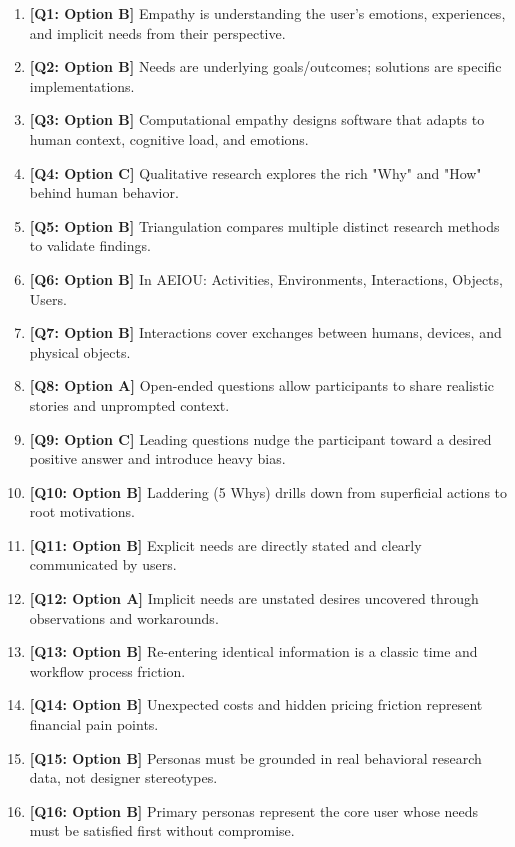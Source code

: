 \begin{expbox}
\begin{enumerate}[leftmargin=6mm, itemsep=2.5mm]
  \item \textbf{[Q1: Option B]} Empathy is understanding the user's emotions, experiences, and implicit needs from their perspective.
  \item \textbf{[Q2: Option B]} Needs are underlying goals/outcomes; solutions are specific implementations.
  \item \textbf{[Q3: Option B]} Computational empathy designs software that adapts to human context, cognitive load, and emotions.
  \item \textbf{[Q4: Option C]} Qualitative research explores the rich "Why" and "How" behind human behavior.
  \item \textbf{[Q5: Option B]} Triangulation compares multiple distinct research methods to validate findings.
  \item \textbf{[Q6: Option B]} In AEIOU: Activities, Environments, Interactions, Objects, Users.
  \item \textbf{[Q7: Option B]} Interactions cover exchanges between humans, devices, and physical objects.
  \item \textbf{[Q8: Option A]} Open-ended questions allow participants to share realistic stories and unprompted context.
  \item \textbf{[Q9: Option C]} Leading questions nudge the participant toward a desired positive answer and introduce heavy bias.
  \item \textbf{[Q10: Option B]} Laddering (5 Whys) drills down from superficial actions to root motivations.
  \item \textbf{[Q11: Option B]} Explicit needs are directly stated and clearly communicated by users.
  \item \textbf{[Q12: Option A]} Implicit needs are unstated desires uncovered through observations and workarounds.
  \item \textbf{[Q13: Option B]} Re-entering identical information is a classic time and workflow process friction.
  \item \textbf{[Q14: Option B]} Unexpected costs and hidden pricing friction represent financial pain points.
  \item \textbf{[Q15: Option B]} Personas must be grounded in real behavioral research data, not designer stereotypes.
  \item \textbf{[Q16: Option B]} Primary personas represent the core user whose needs must be satisfied first without compromise.

\end{enumerate}
\end{expbox}
